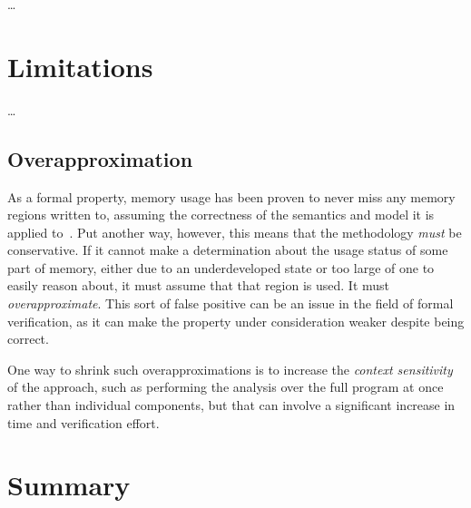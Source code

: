 \todo\dots

\section{Limitations}\label{mem_use_limits}
\todo\dots

\subsection{Overapproximation}\label{mem_use_over}
As a formal property, memory usage has been proven to never miss any memory regions
written to, assuming the correctness of the semantics and model it is applied
to~\citep{bockenek2019preservation,popl2019underreview}.
Put another way, however, this means that the methodology \emph{must} be conservative.
If it cannot make a determination about the usage status of some part of memory,
either due to an underdeveloped state or too large of one to easily reason about,
it must assume that that region is used. It must \emph{overapproximate}.%
This sort of false positive can be an issue in the field of formal verification,
as it can make the property under consideration weaker despite being correct.

One way to shrink such overapproximations is to increase the
\emph{context sensitivity}
of the approach, such as performing the analysis over the full program at once
rather than individual components, but that can involve
a significant increase in time and verification effort.


\section{Summary}
